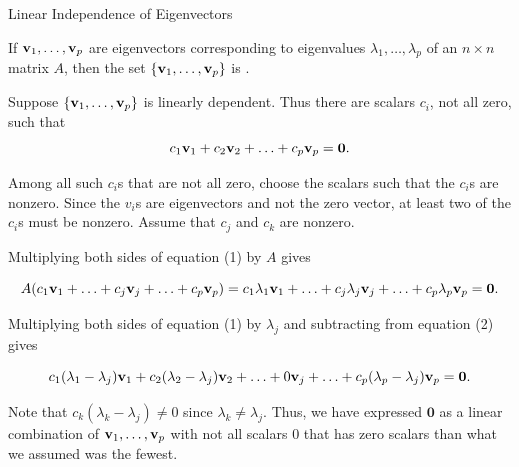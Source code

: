 \documentclass[xcolor=dvipsnames,aspectratio=169,t]{beamer}
\begin{document}
\begin{frame}{Linear Independence of Eigenvectors}
  \begin{theorem}
  If $\mathbf{v}_1,\ldots,\mathbf{v}_p$ are eigenvectors corresponding to  eigenvalues $\lambda_1, \ldots, \lambda_p$ of an $n \times n$ matrix $A$, then the set $\left\{ \mathbf{v}_1, \ldots, \mathbf{v}_p \right\}$ is .
  \end{theorem}

  \pause
  {\small
  Suppose $\left\{ \mathbf{v}_1, \ldots, \mathbf{v}_p \right\}$ is linearly dependent.
  Thus there are scalars $c_i$, not all zero, such that
  \vspace{-0.15in}
  \begin{equation}
  c_1 \mathbf{v}_1 + c_2 \mathbf{v}_2 + \ldots + c_p \mathbf{v}_p = \mathbf{0}.
  \end{equation}
  \vspace*{-0.3in}

  Among all such $c_i$s that are not all zero, choose the scalars such that the  $c_i$s are nonzero.
  Since the $v_i$s are eigenvectors and not the zero vector, at least two of the $c_i$s must be nonzero.  Assume that $c_j$ and $c_k$ are nonzero.

  \pause
  Multiplying both sides of equation (1) by $A$ gives
  \vspace{-0.15in}

  \begin{equation}
  A(c_1 \mathbf{v}_1 + \ldots +c_j \mathbf{v}_j + \ldots + c_p \mathbf{v}_p) = c_1 \lambda_1 \mathbf{v}_1 + \ldots +c_j \lambda_j \mathbf{v}_j + \ldots + c_p \lambda_p \mathbf{v}_p = \mathbf{0}.
  \end{equation}
  \vspace{-0.2in}

  \pause
  Multiplying both sides of equation (1) by $\lambda_j$ and subtracting from equation (2) gives
  \vspace{-0.15in}

  \begin{equation}
  c_1 (\lambda_1 - \lambda_j)\mathbf{v}_1 + c_2 (\lambda_2 - \lambda_j)\mathbf{v}_2 + \ldots + 0\mathbf{v}_j + \ldots + c_p (\lambda_p - \lambda_j)\mathbf{v}_p = \mathbf{0}.
  \end{equation}
  \vspace{-0.2in}

  \pause
  Note that $c_k (\lambda_k-\lambda_j)\ne 0$ since $\lambda_k\ne\lambda_j$.
  Thus, we have expressed $\mathbf{0}$ as a linear combination of $\mathbf{v}_1,\ldots,\mathbf{v}_p$ with not all scalars $0$ that has  zero scalars than what we assumed was the fewest. 
  \hfill\blue{\qed}
  }
\end{frame}
\end{document}
